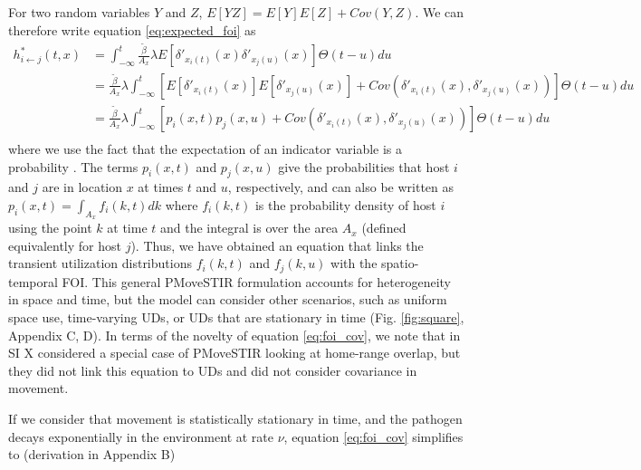 ﻿\documentclass[11pt]{article}
\begin{document}
For two random variables $Y$ and $Z$, $E[YZ] = E[Y]E[Z] + Cov(Y, Z)$.  We can therefore write equation \ref{eq:expected_foi} as
\begin{equation}
    \begin{aligned}
        h^*_{i \leftarrow j}(t, x) &= \int_{-\infty}^{t} \frac{\tilde{\beta}}{A_x} \lambda E[\delta'_{x_i(t)}(x) \delta'_{x_j(u)}(x)] \Theta(t - u) du \\
        &= \frac{\tilde{\beta}}{A_x} \lambda \int_{-\infty}^{t} [E[\delta'_{x_i(t)}(x)] E[\delta'_{x_j(u)}(x)] + Cov(\delta'_{x_i(t)}(x), \delta'_{x_j(u)}(x))] \Theta(t - u) du \\
        &= \frac{\tilde{\beta}}{A_x} \lambda \int_{-\infty}^{t} [p_i(x, t) p_j(x, u) + Cov(\delta'_{x_i(t)}(x), \delta'_{x_j(u)}(x))] \Theta(t - u) du \\
    \end{aligned}
    \label{eq:foi_cov}
\end{equation}
where we use the fact that the expectation of an indicator variable is a probability \citep{Grimmett2001}. The terms $p_i(x, t)$ and $p_j(x,u)$ give the probabilities that host $i$ and $j$ are in location $x$ at times $t$ and $u$, respectively, and can also be written as $p_i(x, t) = \int_{A_x} f_i(k, t) dk$ where $f_i(k, t)$ is the probability density of host $i$ using the point $k$ at time $t$ and the integral is over the area $A_x$ (defined equivalently for host $j$). Thus, we have obtained an equation that links the transient utilization distributions $f_i(k, t)$ and $f_j(k, u)$ with the spatio-temporal FOI.
This general PMoveSTIR formulation accounts for heterogeneity in space and time, but the model can consider other scenarios, such as uniform space use, time-varying UDs, or UDs that are stationary in time (Fig. \ref{fig:square}, Appendix C, D).  In terms of the novelty of equation \ref{eq:foi_cov}, we note that \cite{Wilber2022} in SI X considered a special case of PMoveSTIR looking at home-range overlap, but they did not link this equation to UDs and did not consider covariance in movement.

If we consider that movement is statistically stationary in time, and the pathogen decays exponentially in the environment at rate $\nu$, equation \ref{eq:foi_cov} simplifies to (derivation in Appendix B)
\end{document}
